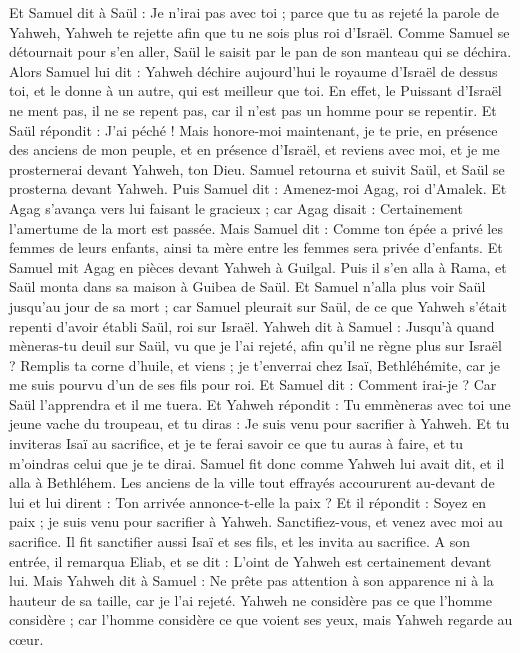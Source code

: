 \begin{multicols}{2}
Et Samuel dit à Saül : Je n'irai pas avec toi ; parce que tu as rejeté la parole de Yahweh, Yahweh te rejette afin que tu ne sois plus roi d'Israël.
Comme Samuel se détournait pour s'en aller, Saül le saisit par le pan de son manteau qui se déchira.
Alors Samuel lui dit : Yahweh déchire aujourd'hui le royaume d'Israël de dessus toi, et le donne à un autre, qui est meilleur que toi.
En effet, le Puissant d'Israël ne ment pas, il ne se repent pas, car il n'est pas un homme pour se repentir.
Et Saül répondit : J'ai péché ! Mais honore-moi maintenant, je te prie, en présence des anciens de mon peuple, et en présence d'Israël, et reviens avec moi, et je me prosternerai devant Yahweh, ton Dieu.
Samuel retourna et suivit Saül, et Saül se prosterna devant Yahweh.
Puis Samuel dit : Amenez-moi Agag, roi d'Amalek. Et Agag s'avança vers lui faisant le gracieux ; car Agag disait : Certainement l'amertume de la mort est passée.
Mais Samuel dit : Comme ton épée a privé les femmes de leurs enfants, ainsi ta mère entre les femmes sera privée d'enfants. Et Samuel mit Agag en pièces devant Yahweh à Guilgal.
Puis il s'en alla à Rama, et Saül monta dans sa maison à Guibea de Saül.
Et Samuel n'alla plus voir Saül jusqu'au jour de sa mort ; car Samuel pleurait sur Saül, de ce que Yahweh s'était repenti d'avoir établi Saül, roi sur Israël.
\VerseOne{}Yahweh dit à Samuel : Jusqu'à quand mèneras-tu deuil sur Saül, vu que je l'ai rejeté, afin qu'il ne règne plus sur Israël ? Remplis ta corne d'huile, et viens ; je t'enverrai chez Isaï, Bethléhémite, car je me suis pourvu d'un de ses fils pour roi.
Et Samuel dit : Comment irai-je ? Car Saül l'apprendra et il me tuera. Et Yahweh répondit : Tu emmèneras avec toi une jeune vache du troupeau, et tu diras : Je suis venu pour sacrifier à Yahweh.
Et tu inviteras Isaï au sacrifice, et je te ferai savoir ce que tu auras à faire, et tu m'oindras celui que je te dirai.
Samuel fit donc comme Yahweh lui avait dit, et il alla à Bethléhem. Les anciens de la ville tout effrayés accoururent au-devant de lui et lui dirent : Ton arrivée annonce-t-elle la paix ?
Et il répondit : Soyez en paix ; je suis venu pour sacrifier à Yahweh. Sanctifiez-vous, et venez avec moi au sacrifice. Il fit sanctifier aussi Isaï et ses fils, et les invita au sacrifice.
A son entrée, il remarqua Eliab, et se dit : L'oint de Yahweh est certainement devant lui.
Mais Yahweh dit à Samuel : Ne prête pas attention à son apparence ni à la hauteur de sa taille, car je l'ai rejeté. Yahweh ne considère pas ce que l'homme considère ; car l'homme considère ce que voient ses yeux, mais Yahweh regarde au cœur.

\end{multicols}
